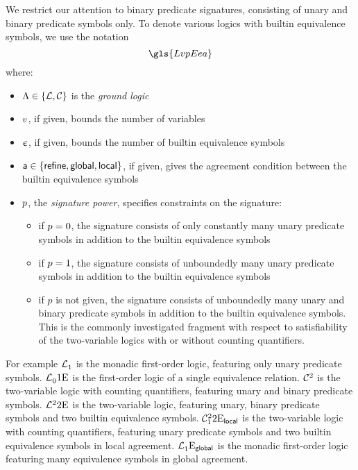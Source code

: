 
We restrict our attention to binary predicate signatures, consisting of unary
and binary predicate symbols only.
To denote various logics with builtin equivalence symbols, we use the notation
\[
  \gls{LvpEea}
\]
where:
\begin{itemize}
  \item $\Lambda \in \left\{\mathcal{L}, \mathcal{C}\right\}$ is the \emph{ground logic}
  \item $v$, if given, bounds the number of variables
  \item $\upepsilon$, if given, bounds the number of builtin equivalence symbols
  \item $\mathsf{a} \in \left\{\mathsf{refine}, \mathsf{global}, \mathsf{local}\right\}$, if given, gives the
  agreement condition between the builtin equivalence symbols
  \item $p$, the \emph{signature power}, specifies constraints on the
  signature:
  \begin{itemize}
    \item if $p = 0$, the signature consists of only constantly many unary
    predicate symbols in addition to the builtin equivalence symbols
    \item if $p = 1$, the signature consists of unboundedly many unary
    predicate symbols in addition to the builtin equivalence symbols
    \item if $p$ is not given, the signature consists of unboundedly many unary
    and binary predicate symbols in addition to the builtin equivalence symbols.
    This is the commonly investigated fragment with respect to satisfiability of
    the two-variable logics with or without counting quantifiers.
  \end{itemize}
\end{itemize}

For example $\mathcal{L}^{{}}_{1}$ is the monadic first-order logic, featuring only
unary predicate symbols.
$\mathcal{L}^{{}}_{0}{1}\mathrm{E}_{{}}$ is the first-order logic of a single equivalence
relation.
$\mathcal{C}^{2}_{{}}$ is the two-variable logic with counting quantifiers, featuring
unary and binary predicate symbols.
$\mathcal{L}^{2}_{{}}{2}\mathrm{E}_{{}}$ is the two-variable logic, featuring unary, binary
predicate symbols and two builtin equivalence symbols.
$\mathcal{C}^{2}_{1}{2}\mathrm{E}_{\mathsf{local}}$ is the two-variable logic with counting quantifiers,
featuring unary predicate symbols and two builtin equivalence symbols in local
agreement.
$\mathcal{L}^{{}}_{1}{{}}\mathrm{E}_{\mathsf{global}}$ is the monadic first-order logic featuring
many equivalence symbols in global agreement.

